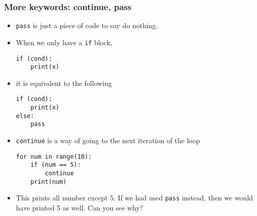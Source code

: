 \documentclass[notes]{beamer}
\begin{document}
	\begin{frame}[fragile]
		\frametitle{More keywords: continue, pass}
		\begin{itemize}
			\item \lstinline|pass| is just a piece of code to say do nothing.
			\item When we only have a \lstinline|if| block, 
			\begin{lstlisting}[xleftmargin=\dimexpr-\leftmargini]
if (cond):
    print(x)
			\end{lstlisting}
			\item it is equivalent to the following
			
			\begin{lstlisting}[xleftmargin=\dimexpr-\leftmargini]
if (cond):
    print(x)
else:
    pass
			\end{lstlisting}
			\pause
			\item \lstinline|continue| is a way of going to the next iteration of the loop
			\begin{lstlisting}[xleftmargin=\dimexpr-\leftmargini]
for num in range(10):
    if (num == 5):
        continue
    print(num)
			\end{lstlisting}
    		\item This prints all number except 5. If we had used \lstinline|pass| instead, then we would have printed 5 as well. Can you see why?
		\end{itemize}
	\end{frame}
	
\end{document}
